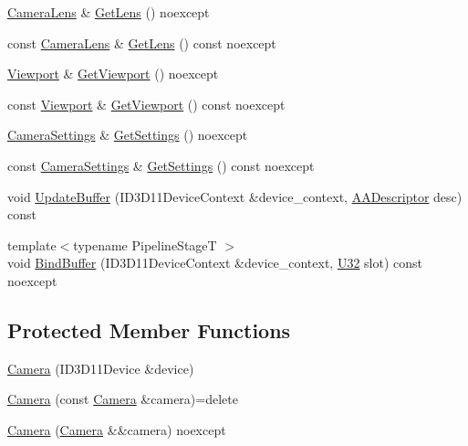 \begin{DoxyCompactItemize}
\item 
\hyperlink{classmage_1_1rendering_1_1_camera_lens}{Camera\+Lens} \& \hyperlink{classmage_1_1rendering_1_1_camera_a49967d5b733b8d2e1ccbfc71c4f66d42}{Get\+Lens} () noexcept
\item 
const \hyperlink{classmage_1_1rendering_1_1_camera_lens}{Camera\+Lens} \& \hyperlink{classmage_1_1rendering_1_1_camera_a3a1156907006b4d60a4e36789216e31a}{Get\+Lens} () const noexcept
\item 
\hyperlink{classmage_1_1rendering_1_1_viewport}{Viewport} \& \hyperlink{classmage_1_1rendering_1_1_camera_aff1dea377f7f36b1d518369b3f8108cc}{Get\+Viewport} () noexcept
\item 
const \hyperlink{classmage_1_1rendering_1_1_viewport}{Viewport} \& \hyperlink{classmage_1_1rendering_1_1_camera_a5d91ec5a395b638140c107a192faa2a3}{Get\+Viewport} () const noexcept
\item 
\hyperlink{classmage_1_1rendering_1_1_camera_settings}{Camera\+Settings} \& \hyperlink{classmage_1_1rendering_1_1_camera_a32588a00052469be808d2819953ea2a4}{Get\+Settings} () noexcept
\item 
const \hyperlink{classmage_1_1rendering_1_1_camera_settings}{Camera\+Settings} \& \hyperlink{classmage_1_1rendering_1_1_camera_a65d79baabdaaf9847102a03f6965e0ed}{Get\+Settings} () const noexcept
\item 
void \hyperlink{classmage_1_1rendering_1_1_camera_a02aa9510bbdebd7b75339b7ad3e3edba}{Update\+Buffer} (I\+D3\+D11\+Device\+Context \&device\+\_\+context, \hyperlink{namespacemage_1_1rendering_a25c189fd1da946d7a8f0abdd4f0e6afa}{A\+A\+Descriptor} desc) const
\item 
{\footnotesize template$<$typename Pipeline\+StageT $>$ }\\void \hyperlink{classmage_1_1rendering_1_1_camera_aa950bdd33e00fc78ebb496b58e0de5b0}{Bind\+Buffer} (I\+D3\+D11\+Device\+Context \&device\+\_\+context, \hyperlink{namespacemage_a41c104c036fba3756a74e19f793eeaa1}{U32} slot) const noexcept
\end{DoxyCompactItemize}
\subsection*{Protected Member Functions}
\begin{DoxyCompactItemize}
\item 
\hyperlink{classmage_1_1rendering_1_1_camera_a872aafc40d35c1481a4147c73fdbc00a}{Camera} (I\+D3\+D11\+Device \&device)
\item 
\hyperlink{classmage_1_1rendering_1_1_camera_ac4e1e9f230416c0aaea12d2b0fff02c1}{Camera} (const \hyperlink{classmage_1_1rendering_1_1_camera}{Camera} \&camera)=delete
\item 
\hyperlink{classmage_1_1rendering_1_1_camera_a7ac683929b75589e3f396a76a6afb9cf}{Camera} (\hyperlink{classmage_1_1rendering_1_1_camera}{Camera} \&\&camera) noexcept
\end{DoxyCompactItemize}
